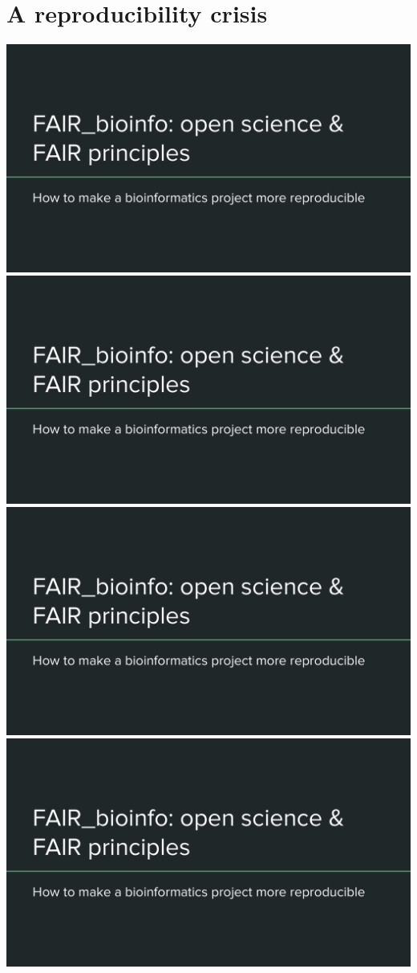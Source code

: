 \section{A reproducibility crisis}
\includegraphics[page=4,scale=0.6]{01_OS_and_FAIR_intro.pdf}
\includegraphics[page=5,scale=0.6]{01_OS_and_FAIR_intro.pdf}
\includegraphics[page=6,scale=0.6]{01_OS_and_FAIR_intro.pdf}
\includegraphics[page=7,scale=0.6]{01_OS_and_FAIR_intro.pdf}

